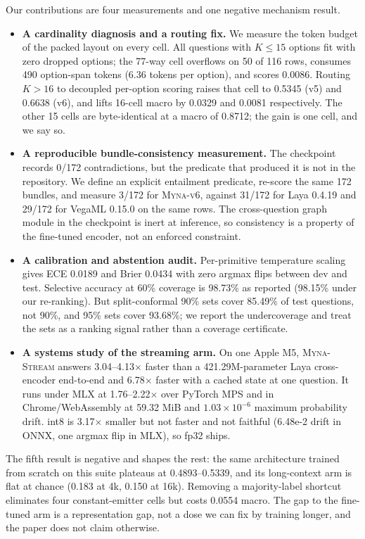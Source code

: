 \documentclass[11pt]{article}
\newcommand{\stream}{\textsc{Myna-Stream}}
\newcommand{\vsix}{\textsc{Myna-v6}}
\begin{document}
Our contributions are four measurements and one negative mechanism result.
\begin{itemize}
\item \textbf{A cardinality diagnosis and a routing fix.} We measure the token budget of the packed layout on every cell. All questions with $K\le15$ options fit with zero dropped options; the 77-way cell overflows on 50 of 116 rows, consumes 490 option-span tokens (6.36 tokens per option), and scores 0.0086. Routing $K>16$ to decoupled per-option scoring raises that cell to 0.5345 (v5) and 0.6638 (v6), and lifts 16-cell macro by 0.0329 and 0.0081 respectively. The other 15 cells are byte-identical at a macro of 0.8712; the gain is one cell, and we say so.
\item \textbf{A reproducible bundle-consistency measurement.} The checkpoint records 0/172 contradictions, but the predicate that produced it is not in the repository. We define an explicit entailment predicate, re-score the same 172 bundles, and measure 3/172 for \vsix{}, against 31/172 for Laya 0.4.19 and 29/172 for VegaML 0.15.0 on the same rows. The cross-question graph module in the checkpoint is inert at inference, so consistency is a property of the fine-tuned encoder, not an enforced constraint.
\item \textbf{A calibration and abstention audit.} Per-primitive temperature scaling gives ECE 0.0189 and Brier 0.0434 with zero argmax flips between dev and test. Selective accuracy at 60\% coverage is 98.73\% as reported (98.15\% under our re-ranking). But split-conformal 90\% sets cover 85.49\% of test questions, not 90\%, and 95\% sets cover 93.68\%; we report the undercoverage and treat the sets as a ranking signal rather than a coverage certificate.
\item \textbf{A systems study of the streaming arm.} On one Apple M5, \stream{} answers 3.04--4.13$\times$ faster than a 421.29M-parameter Laya cross-encoder end-to-end and 6.78$\times$ faster with a cached state at one question. It runs under MLX at 1.76--2.22$\times$ over PyTorch MPS and in Chrome/WebAssembly at 59.32 MiB and $1.03\times10^{-6}$ maximum probability drift. int8 is 3.17$\times$ smaller but not faster and not faithful (6.48e-2 drift in ONNX, one argmax flip in MLX), so fp32 ships.
\end{itemize}

The fifth result is negative and shapes the rest: the same architecture trained from scratch on this suite plateaus at 0.4893--0.5339, and its long-context arm is flat at chance (0.183 at 4k, 0.150 at 16k). Removing a majority-label shortcut eliminates four constant-emitter cells but costs 0.0554 macro. The gap to the fine-tuned arm is a representation gap, not a dose we can fix by training longer, and the paper does not claim otherwise.
\end{document}
